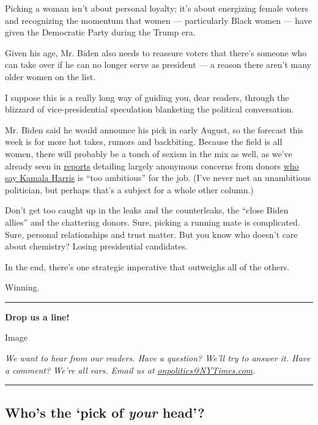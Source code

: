 Picking a woman isn't about personal loyalty; it's about energizing
female voters and recognizing the momentum that women --- particularly
Black women --- have given the Democratic Party during the Trump era.

Given his age, Mr. Biden also needs to reassure voters that there's
someone who can take over if he can no longer serve as president --- a
reason there aren't many older women on the list.

I suppose this is a really long way of guiding you, dear readers,
through the blizzard of vice-presidential speculation blanketing the
political conversation.

Mr. Biden said he would announce his pick in early August, so the
forecast this week is for more hot takes, rumors and backbiting. Because
the field is all women, there will probably be a touch of sexism in the
mix as well, as we've already seen in
\href{https://www.politico.com/news/2020/07/27/kamala-harris-biden-vp-381829}{reports}
detailing largely anonymous concerns from donors
\href{https://twitter.com/feliciasonmez/status/1288587415813345282}{who
say Kamala Harris} is ``too ambitious'' for the job. (I've never met an
unambitious politician, but perhaps that's a subject for a whole other
column.)

Don't get too caught up in the leaks and the counterleaks, the ``close
Biden allies'' and the chattering donors. Sure, picking a running mate
is complicated. Sure, personal relationships and trust matter. But you
know who doesn't care about chemistry? Losing presidential candidates.

In the end, there's one strategic imperative that outweighs all of the
others.

Winning.

\begin{center}\rule{0.5\linewidth}{\linethickness}\end{center}

\textbf{Drop us a line!}

Image

\emph{We want to hear from our readers. Have a question? We'll try to
answer it. Have a comment? We're all ears. Email us at}
\href{mailto:onpolitics@NYTimes.com}{\emph{onpolitics@NYTimes.com}}\emph{.}

\begin{center}\rule{0.5\linewidth}{\linethickness}\end{center}

\hypertarget{whos-the-pick-of-your-head}{%
\subsection{\texorpdfstring{Who's the `pick of \emph{your}
head'?}{Who's the `pick of your head'?}}\label{whos-the-pick-of-your-head}}

